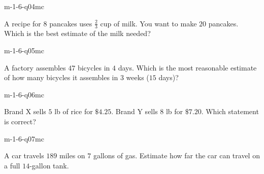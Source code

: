 \begin{practiceQuestion}{m-1-6-q04}{mc}
\begin{questionText}
A recipe for $8$ pancakes uses $\frac{2}{3}$ cup of milk. You want to make $20$ pancakes. Which is the best estimate of the milk needed?
\end{questionText}
\end{practiceQuestion}

\begin{practiceQuestion}{m-1-6-q05}{mc}
\begin{questionText}
A factory assembles $47$ bicycles in $4$ days. Which is the most reasonable estimate of how many bicycles it assembles in $3$ weeks ($15$ days)?
\end{questionText}
\end{practiceQuestion}

\begin{practiceQuestion}{m-1-6-q06}{mc}
\begin{questionText}
Brand X sells $5$ lb of rice for $\$4.25$. Brand Y sells $8$ lb for $\$7.20$. Which statement is correct?
\end{questionText}
\end{practiceQuestion}

\begin{practiceQuestion}{m-1-6-q07}{mc}
\begin{questionText}
A car travels $189$ miles on $7$ gallons of gas. Estimate how far the car can travel on a full $14$-gallon tank.
\end{questionText}
\end{practiceQuestion}

